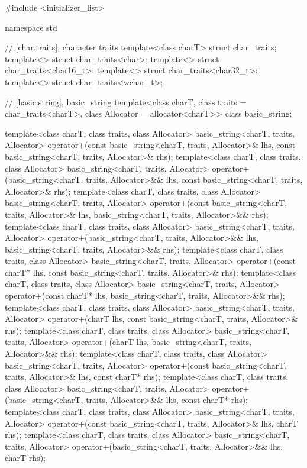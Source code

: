 \begin{codeblock}
#include <initializer_list>

namespace std {
  // \ref{char.traits}, character traits
  template<class charT> struct char_traits;
  template<> struct char_traits<char>;
  template<> struct char_traits<char16_t>;
  template<> struct char_traits<char32_t>;
  template<> struct char_traits<wchar_t>;

  // \ref{basic.string}, basic_string
  template<class charT, class traits = char_traits<charT>,
    class Allocator = allocator<charT>>
      class basic_string;

  template<class charT, class traits, class Allocator>
    basic_string<charT, traits, Allocator>
      operator+(const basic_string<charT, traits, Allocator>& lhs,
                const basic_string<charT, traits, Allocator>& rhs);
  template<class charT, class traits, class Allocator>
    basic_string<charT, traits, Allocator>
      operator+(basic_string<charT, traits, Allocator>&& lhs,
                const basic_string<charT, traits, Allocator>& rhs);
  template<class charT, class traits, class Allocator>
    basic_string<charT, traits, Allocator>
      operator+(const basic_string<charT, traits, Allocator>& lhs,
                basic_string<charT, traits, Allocator>&& rhs);
  template<class charT, class traits, class Allocator>
    basic_string<charT, traits, Allocator>
      operator+(basic_string<charT, traits, Allocator>&& lhs,
                basic_string<charT, traits, Allocator>&& rhs);
  template<class charT, class traits, class Allocator>
    basic_string<charT, traits, Allocator>
      operator+(const charT* lhs,
                const basic_string<charT, traits, Allocator>& rhs);
  template<class charT, class traits, class Allocator>
    basic_string<charT, traits, Allocator>
      operator+(const charT* lhs,
                basic_string<charT, traits, Allocator>&& rhs);
  template<class charT, class traits, class Allocator>
    basic_string<charT, traits, Allocator>
      operator+(charT lhs, const basic_string<charT, traits, Allocator>& rhs);
  template<class charT, class traits, class Allocator>
    basic_string<charT, traits, Allocator>
      operator+(charT lhs, basic_string<charT, traits, Allocator>&& rhs);
  template<class charT, class traits, class Allocator>
    basic_string<charT, traits, Allocator>
      operator+(const basic_string<charT, traits, Allocator>& lhs,
                const charT* rhs);
  template<class charT, class traits, class Allocator>
    basic_string<charT, traits, Allocator>
      operator+(basic_string<charT, traits, Allocator>&& lhs,
                const charT* rhs);
  template<class charT, class traits, class Allocator>
    basic_string<charT, traits, Allocator>
      operator+(const basic_string<charT, traits, Allocator>& lhs, charT rhs);
  template<class charT, class traits, class Allocator>
    basic_string<charT, traits, Allocator>
      operator+(basic_string<charT, traits, Allocator>&& lhs, charT rhs);

}
\end{codeblock}
